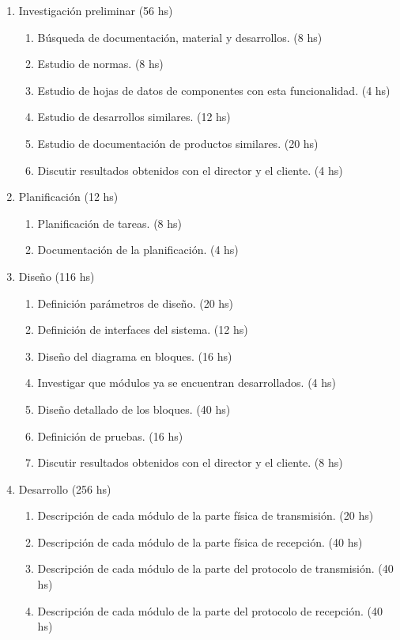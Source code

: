 \documentclass[11pt]{charter}
\begin{document}
\begin{enumerate}
\item Investigación preliminar (56 hs)
	\begin{enumerate}
	\item Búsqueda de documentación, material y desarrollos. (8 hs)
	\item Estudio de normas. (8 hs)
	\item Estudio de hojas de datos de componentes con esta funcionalidad. (4 hs)
	\item Estudio de desarrollos similares. (12 hs)
	\item Estudio de documentación de productos similares. (20 hs)
	\item Discutir resultados obtenidos con el director y el cliente. (4 hs)
	\end{enumerate}
\item Planificación (12 hs)
	\begin{enumerate}
	\item Planificación de tareas. (8 hs)
	\item Documentación de la planificación. (4 hs)
	\end{enumerate}
\item Diseño (116 hs)
	\begin{enumerate}
	\item Definición parámetros de diseño. (20 hs)
	\item Definición de interfaces del sistema. (12 hs)
	\item Diseño del diagrama en bloques. (16 hs)
	\item Investigar que módulos ya se encuentran desarrollados. (4 hs)
	\item Diseño detallado de los bloques. (40 hs)
	\item Definición de pruebas. (16 hs)
	\item Discutir resultados obtenidos con el director y el cliente. (8 hs)
	\end{enumerate}
\item Desarrollo (256 hs)
	\begin{enumerate}
	\item Descripción de cada módulo de la parte física de transmisión. (20 hs)
	\item Descripción de cada módulo de la parte física de recepción. (40 hs)
	\item Descripción de cada módulo de la parte del protocolo de transmisión. (40 hs)
	\item Descripción de cada módulo de la parte del protocolo de recepción. (40 hs)

\end{enumerate}
\end{enumerate}
\end{document}
